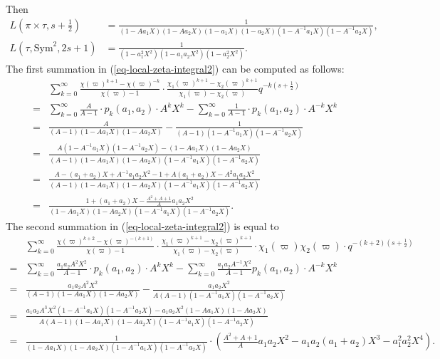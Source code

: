 \documentclass[11pt]{amsart}
\theoremstyle{definition}
\theoremstyle{remark}
\begin{document}
Then 
\begin{equation*}
\begin{split}
L(\pi\times \tau, s+\frac{1}{2}) &= \frac{1 }{(1-Aa_1 X)(1-Aa_2 X)(1-a_1 X)(1-a_2X)(1-A^{-1}a_1 X)(1-A^{-1}a_2 X)} , \\
L(\tau, \mathrm{Sym}^2, 2s+1) &= \frac{1}{(1-a_1^2 X^2 )(1-a_1 a_2 X^2)(1-a_2^2 X^2)}.
\end{split}
\end{equation*}
The first summation in (\ref{eq-local-zeta-integral2}) can be computed as follows:
\begin{equation*}
\begin{split}
&\sum_{k=0}^\infty   \frac{\chi(\varpi)^{k+1}-\chi(\varpi)^{-k}}{\chi(\varpi)-1}  \cdot \frac{\chi_1(\varpi)^{k+1}-\chi_2(\varpi)^{k+1}}{\chi_1(\varpi)-\chi_2(\varpi)}    q^{-k(s+\frac{1}{2})} \\
=&\sum_{k=0}^\infty   \frac{A}{A-1}  \cdot  p_k(a_1, a_2)  \cdot A^k X^k- \sum_{k=0}^\infty   \frac{1}{A-1}  \cdot  p_k(a_1, a_2) \cdot A^{-k}  X^k \\
=&   \frac{A}{(A-1)(1-Aa_1 X)(1-Aa_2 X)} - \frac{1}{(A-1)(1-A^{-1}a_1 X)(1-A^{-1}a_2 X)} \\
=&\frac{A(1-A^{-1}a_1 X)(1-A^{-1}a_2 X)-  (1-Aa_1 X)(1-Aa_2 X)    }{(A-1)(1-Aa_1 X)(1-Aa_2 X)(1-A^{-1}a_1 X)(1-A^{-1}a_2 X)} \\
=&   \frac{ A-(a_1+a_2)X+A^{-1} a_1 a_2 X^2-1+A(a_1+a_2)X-A^2 a_1 a_2 X^2   }{(A-1)(1-Aa_1 X)(1-Aa_2 X)(1-A^{-1}a_1 X)(1-A^{-1}a_2 X)} \\
=& \frac{1+(a_1+a_2)X -  \frac{A^2+A+1}{A} a_1 a_2 X^2}{(1-Aa_1 X)(1-Aa_2 X)(1-A^{-1}a_1 X)(1-A^{-1}a_2 X)}.
\end{split}
\end{equation*}
The second summation in (\ref{eq-local-zeta-integral2}) is equal to 
\begin{equation*}
\begin{split}
& \sum_{k=0}^\infty     \frac{\chi(\varpi)^{k+2}-\chi(\varpi)^{-(k+1)}}{\chi(\varpi)-1}  \cdot  \frac{\chi_1(\varpi)^{k+1}-\chi_2(\varpi)^{k+1}}{\chi_1(\varpi)-\chi_2(\varpi)}\cdot \chi_1(\varpi)\chi_2(\varpi) \cdot q^{-(k+2)(s+\frac{1}{2})} \\
=& \sum_{k=0}^\infty \frac{a_1 a_2  A^2 X^{2}}{A-1} \cdot p_k(a_1, a_2) \cdot A^k X^{k} - \sum_{k=0}^\infty \frac{a_1 a_2  A^{-1} X^2}{A-1} p_k(a_1, a_2) \cdot A^{-k} X^{k} \\
=&  \frac{a_1 a_2  A^2 X^{2}}{(A-1) (1-Aa_1 X)(1-Aa_2 X) } -\frac{a_1 a_2 X^2}{A(A-1) (1-A^{-1}a_1 X)(1-A^{-1}a_2 X)  } \\
=&  \frac{ a_1 a_2  A^3 X^{2} (1-A^{-1}a_1 X)(1-A^{-1}a_2 X)   - a_1 a_2X^2(1-Aa_1 X)(1-Aa_2 X)  }{A(A-1) (1-Aa_1 X)(1-Aa_2 X)(1-A^{-1}a_1 X)(1-A^{-1}a_2 X)} \\
=& \frac{1 }{(1-Aa_1 X)(1-Aa_2 X)(1-A^{-1}a_1 X)(1-A^{-1}a_2 X)} \cdot  \left(  \frac{A^2+A+1}{A} a_1 a_2 X^2  -a_1 a_2(a_1+a_2)X^3 -a_1^2 a_2^2 X^4 \right).
 \end{split}
\end{equation*}
\end{document}
